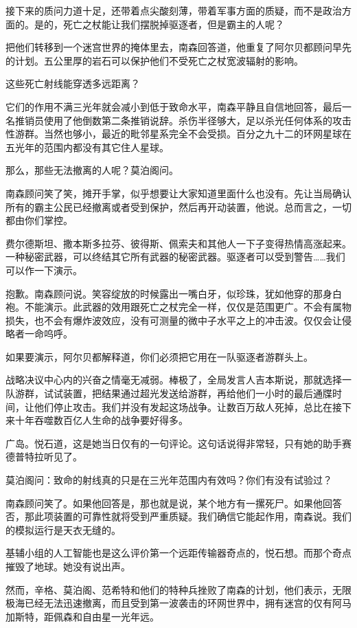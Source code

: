 \documentclass[AutoFakeBold=true]{book}
\begin{document}
接下来的质问力道十足，还带着点尖酸刻薄，带着军事方面的质疑，而不是政治方面的。是的，死亡之杖能让我们摆脱掉驱逐者，但是霸主的人呢？

把他们转移到一个迷宫世界的掩体里去，南森回答道，他重复了阿尔贝都顾问早先的计划。五公里厚的岩石可以保护他们不受死亡之杖宽波辐射的影响。

这些死亡射线能穿透多远距离？

它们的作用不满三光年就会减小到低于致命水平，南森平静且自信地回答，最后一名推销员使用了他倒数第二条推销说辞。杀伤半径够大，足以杀光任何体系的攻击性游群。当然也够小，最近的毗邻星系完全不会受损。百分之九十二的环网星球在五光年的范围内都没有其它住人星球。

那么，那些无法撤离的人呢？莫泊阁问。

南森顾问笑了笑，摊开手掌，似乎想要让大家知道里面什么也没有。先让当局确认所有的霸主公民已经撤离或者受到保护，然后再开动装置，他说。总而言之，一切都由你们掌控。

费尔德斯坦、撒本斯多拉芬、彼得斯、佩索夫和其他人一下子变得热情高涨起来。一种秘密武器，可以终结其它所有武器的秘密武器。驱逐者可以受到警告……我们可以作一下演示。

抱歉。南森顾问说。笑容绽放的时候露出一嘴白牙，似珍珠，犹如他穿的那身白袍。不能演示。此武器的效用跟死亡之杖完全一样，仅仅是范围更广。不会有属物损失，也不会有爆炸波效应，没有可测量的微中子水平之上的冲击波。仅仅会让侵略者一命呜呼。

如果要演示，阿尔贝都解释道，你们必须把它用在一队驱逐者游群头上。

战略决议中心内的兴奋之情毫无减弱。棒极了，全局发言人吉本斯说，那就选择一队游群，试试装置，把结果通过超光发送给游群，再给他们一小时的最后通牒时间，让他们停止攻击。我们并没有发起这场战争。让数百万敌人死掉，总比在接下来十年吞噬数百亿人生命的战争要好得多。

{\kaishu 广岛}。悦石道，这是她当日仅有的一句评论。这句话说得非常轻，只有她的助手赛德普特拉听见了。

莫泊阁问：致命的射线真的只是在三光年范围内有效吗？你们有没有试验过？

南森顾问笑了。如果他回答是，那也就是说，某个地方有一摞死尸。如果他回答否，那此项装置的可靠性就将受到严重质疑。我们确信它能起作用，南森说。我们的模拟运行是天衣无缝的。

{\kaishu 基辅小组的人工智能也是这么评价第一个远距传输器奇点的，}悦石想。{\kaishu 而那个奇点摧毁了地球。}她没有说出声。

然而，辛格、莫泊阁、范希特和他们的特种兵挫败了南森的计划，他们表示，无限极海已经无法迅速撤离，而且受到第一波袭击的环网世界中，拥有迷宫的仅有阿马加斯特，距佩森和自由星一光年远。
\end{document}
